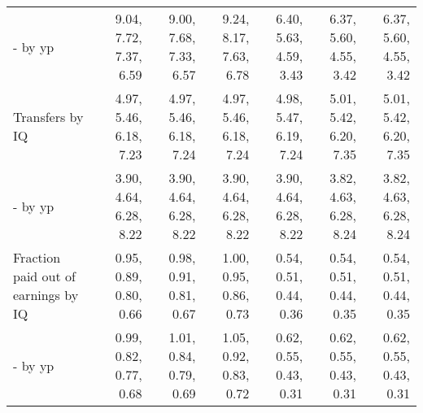 \begin{tabular}{lrrrrrr}
- by yp & 9.04, 7.72, 7.37, 6.59  & 9.00, 7.68, 7.33, 6.57  & 9.24, 8.17, 7.63, 6.78  & 6.40, 5.63, 4.59, 3.43  & 6.37, 5.60, 4.55, 3.42  & 6.37, 5.60, 4.55, 3.42  \\ 
Transfers by IQ & 4.97, 5.46, 6.18, 7.23  & 4.97, 5.46, 6.18, 7.24  & 4.97, 5.46, 6.18, 7.24  & 4.98, 5.47, 6.19, 7.24  & 5.01, 5.42, 6.20, 7.35  & 5.01, 5.42, 6.20, 7.35  \\ 
- by yp & 3.90, 4.64, 6.28, 8.22  & 3.90, 4.64, 6.28, 8.22  & 3.90, 4.64, 6.28, 8.22  & 3.90, 4.64, 6.28, 8.22  & 3.82, 4.63, 6.28, 8.24  & 3.82, 4.63, 6.28, 8.24  \\ 
Fraction paid out of earnings by IQ & 0.95, 0.89, 0.80, 0.66  & 0.98, 0.91, 0.81, 0.67  & 1.00, 0.95, 0.86, 0.73  & 0.54, 0.51, 0.44, 0.36  & 0.54, 0.51, 0.44, 0.35  & 0.54, 0.51, 0.44, 0.35  \\ 
- by yp & 0.99, 0.82, 0.77, 0.68  & 1.01, 0.84, 0.79, 0.69  & 1.05, 0.92, 0.83, 0.72  & 0.62, 0.55, 0.43, 0.31  & 0.62, 0.55, 0.43, 0.31  & 0.62, 0.55, 0.43, 0.31  \\ 
\hline
\end{tabular}%

